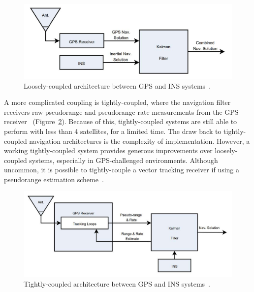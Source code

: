 \begin{figure}[!ht]
    \centering
    \includegraphics[width=\linewidth]{Figures/LC.jpg}
    \caption{Loosely-coupled architecture between GPS and INS systems~\cite{hammAnalysisSimulatedPerformance2005}.}\label{fig:LC}
\end{figure}

A more complicated coupling is {tightly-coupled}, where the navigation filter receivers raw pseudorange and pseudorange rate measurements from the GPS receiver~\cite{kaplanUnderstandingGPSPrinciples2006} (Figure~\ref{fig:TC}). Because of this, tightly-coupled systems are still able to perform with less than 4 satellites, for a limited time. The draw back to tightly-coupled navigation architectures is the complexity of implementation. However, a working tightly-coupled system provides generous improvements over loosely-coupled systems, especially in GPS-challenged environments. Although uncommon, it is possible to tightly-couple a vector tracking receiver if using a pseudorange estimation scheme~\cite{grierPositionNavigationTiming}.

\begin{figure}[!ht]
    \centering
    \includegraphics[width=\linewidth]{Figures/TC.jpg}
    \caption{Tightly-coupled architecture between GPS and INS systems~\cite{hammAnalysisSimulatedPerformance2005}.}\label{fig:TC}
\end{figure}

